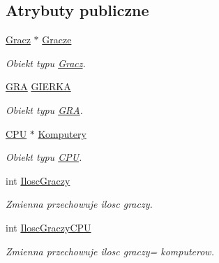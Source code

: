 \subsection*{Atrybuty publiczne}
\begin{DoxyCompactItemize}
\item 
\hyperlink{class_gracz}{Gracz} $\ast$ \hyperlink{class_interfejs_ab7dda8ddff87d9cb57f210f427871de8}{Gracze}
\begin{DoxyCompactList}\small\item\em Obiekt typu \hyperlink{class_gracz}{Gracz}. \end{DoxyCompactList}\item 
\hyperlink{class_g_r_a}{G\-R\-A} \hyperlink{class_interfejs_a9d2350b90035a0faadcb7b9515821db6}{G\-I\-E\-R\-K\-A}
\begin{DoxyCompactList}\small\item\em Obiekt typu \hyperlink{class_g_r_a}{G\-R\-A}. \end{DoxyCompactList}\item 
\hyperlink{class_c_p_u}{C\-P\-U} $\ast$ \hyperlink{class_interfejs_a81d63adb225efb2fb0c97f81841156b3}{Komputery}
\begin{DoxyCompactList}\small\item\em Obiekt typu \hyperlink{class_c_p_u}{C\-P\-U}. \end{DoxyCompactList}\item 
int \hyperlink{class_interfejs_a4978f16cdd27e1f44580d29a3b80e1f5}{Ilosc\-Graczy}
\begin{DoxyCompactList}\small\item\em Zmienna przechowuje ilosc graczy. \end{DoxyCompactList}\item 
int \hyperlink{class_interfejs_ab2e839ed9e43affb8701d89338564e2c}{Ilosc\-Graczy\-C\-P\-U}
\begin{DoxyCompactList}\small\item\em Zmienna przechowuje ilosc graczy= komputerow. \end{DoxyCompactList}\end{DoxyCompactItemize}
